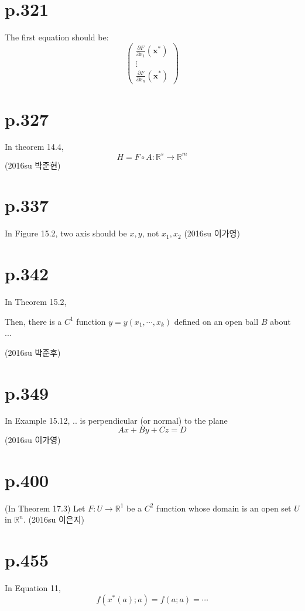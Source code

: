 \documentclass[a4paper]{article}
\begin{document}
\section{p.321}
The first equation should be: \[
\begin{pmatrix}
	\frac{\partial F}{\partial x_1}(\mathbf{x}^\ast)\\
	\vdots\\
	\frac{\partial F}{\partial x_n}(\mathbf{x}^\ast)
\end{pmatrix}
\]

\section{p.327} %
\label{sec:p_327}
In theorem 14.4,
\[
	H = F \circ A : \mathbb{R}^s \rightarrow \mathbb{R}^m
\]
(2016su 박준현)

\section{p.337} %
\label{sec:p_337}
In Figure 15.2, two axis should be $x,y$, not $x_1, x_2$ (2016su 이가영)

\section{p.342} %
\label{sec:p_342}
In Theorem 15.2,

Then, there is a $C^1$ function $y=y(x_1,\cdots,x_k)$ defined on an open ball $B$ about ...

(2016su 박준후)

\section{p.349} %
\label{sec:p_349}
In Example 15.12, .. is perpendicular (or normal) to the plane\[
	Ax+By+Cz=D
\](2016su 이가영)

\section{p.400} %
\label{sec:p_400}
(In Theorem 17.3) Let $F:U\rightarrow \mathbb{R}^1$ be a $C^2$ function whose domain is an open set $U$ in $\mathbb{R}^n$.
(2016su 이은지)

\section{p.455} %
\label{sec:p_455}
In Equation 11, \[
	f(x^\ast(a);a)=f(a;a)= \cdots
\]
\end{document}
